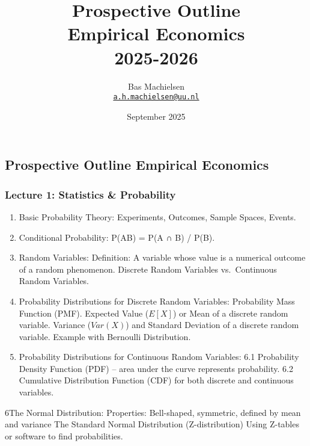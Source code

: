 \documentclass[
]{article}
\title{Prospective Outline\\
Empirical Economics\\
2025-2026}
\author{Bas Machielsen\\
\href{mailto:a.h.machielsen@uu.nl}{\nolinkurl{a.h.machielsen@uu.nl}}}
\date{September 2025}
\begin{document}
\maketitle

\subsection{Prospective Outline Empirical
Economics}\label{prospective-outline-empirical-economics}

\subsubsection{Lecture 1: Statistics \&
Probability}\label{lecture-1-statistics-probability}

\begin{enumerate}
\def\labelenumi{\arabic{enumi}.}
\item
  Basic Probability Theory: Experiments, Outcomes, Sample Spaces,
  Events.
\item
  Conditional Probability: P(A\textbar B) = P(A ∩ B) / P(B).
\item
  Random Variables: Definition: A variable whose value is a numerical
  outcome of a random phenomenon. Discrete Random Variables
  vs.~Continuous Random Variables.
\item
  Probability Distributions for Discrete Random Variables: Probability
  Mass Function (PMF). Expected Value (\(E[X]\)) or Mean of a discrete
  random variable. Variance (\(Var(X)\)) and Standard Deviation of a
  discrete random variable. Example with Bernoulli Distribution.
\item
  Probability Distributions for Continuous Random Variables: 6.1
  Probability Density Function (PDF) -- area under the curve represents
  probability. 6.2 Cumulative Distribution Function (CDF) for both
  discrete and continuous variables.
\end{enumerate}

6The Normal Distribution: Properties: Bell-shaped, symmetric, defined by
mean and variance The Standard Normal Distribution (Z-distribution)
Using Z-tables or software to find probabilities.
\end{document}

